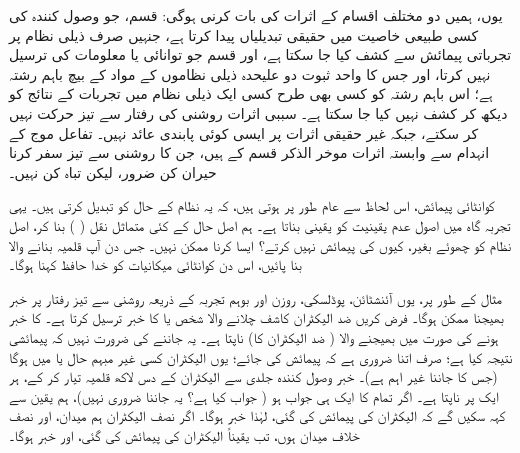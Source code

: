 یوں، ہمیں دو مختلف اقسام کے اثرات کی بات کرنی ہوگی:  قسم، جو وصول کنندہ کی کسی طبیعی خاصیت میں حقیقی تبدیلیاں پیدا کرتا ہے، جنہیں صرف ذیلی نظام پر تجرباتی پیمائش سے کشف کیا جا سکتا ہے، اور  قسم جو توانائی یا معلومات کی ترسیل نہیں کرتا، اور جس کا واحد ثبوت دو علیحدہ ذیلی نظاموں کے مواد کے بیچ باہم رشتہ ہے؛ اس باہم رشتہ کو کسی بھی طرح کسی ایک ذیلی نظام میں تجربات کے نتائج کو دیکھ کر کشف نہیں کیا جا سکتا ہے۔ سببی اثرات روشنی کی رفتار سے تیز حرکت نہیں کر سکتے، جبکہ غیر حقیقی اثرات پر ایسی کوئی پابندی عائد نہیں۔ تفاعل موج کے انہدام سے وابستہ اثرات موخر الذکر قسم کے ہیں، جن کا روشنی سے تیز سفر کرنا حیران کن ضرور، لیکن تباہ کن نہیں۔

کوانٹائی پیمائش، اس لحاظ سے عام طور پر  ہوتی ہیں، کہ یہ نظام کے حال کو تبدیل کرتی ہیں۔ یہی  تجربہ گاہ میں اصول عدم یقینیت کو یقینی بناتا ہے۔ ہم اصل حال کے کئی متماثل نقل ( ) بنا کر، اصل نظام کو چھوئے بغیر، کیوں  کی پیمائش نہیں کرتے؟ ایسا کرنا ممکن نہیں۔ جس دن آپ قلمیہ بنانے والا  بنا پائیں، اس دن کوانٹائی میکانیات کو خدا حافظ کہنا ہوگا۔

مثال کے طور پر، یوں آئنشٹائن، پوڈلسکی، روزن اور بوہم تجربہ کے ذریعہ روشنی سے تیز رفتار پر خبر بھیجنا ممکن ہوگا۔ فرض کریں ضد الیکٹران کاشف چلانے والا شخص  یا  کا خبر ترسیل کرتا ہے۔  کا خبر ہونے کی صورت میں بھیجنے والا ( ضد الیکٹران کا)  ناپتا ہے۔ یہ جاننے کی ضرورت نہیں کہ پیمائشی نتیجہ کیا ہے؛ صرف اتنا ضروری ہے کہ پیمائش کی جائے؛ یوں الیکٹران کسی غیر مبہم حال  یا  میں ہوگا (جس کا جاننا غیر اہم ہے)۔ خبر وصول کنندہ جلدی سے الیکٹران کے دس لاکھ قلمیہ تیار کر کے، ہر ایک پر  ناپتا ہے۔ اگر تمام کا ایک ہی جواب ہو ( جواب کیا ہے؟ یہ جاننا ضروری نہیں)، ہم یقین سے کہہ سکیں گے کہ الیکٹران کی پیمائش کی گئی، لہٰذا خبر  ہوگا۔ اگر نصف الیکٹران ہم میدان، اور نصف خلاف میدان ہوں، تب یقیناً الیکٹران کی پیمائش  کی گئی، اور  خبر ہوگا۔

